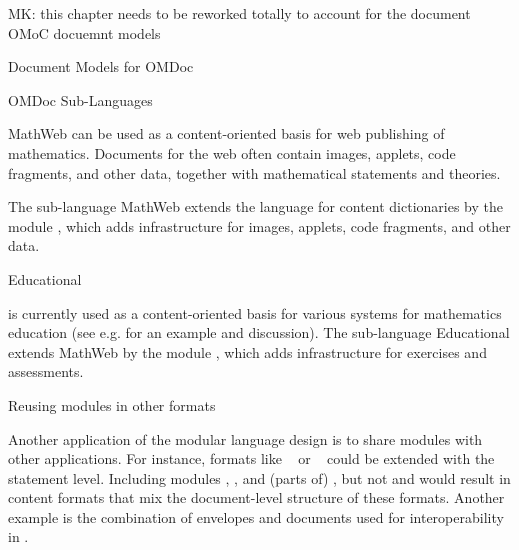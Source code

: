 \begin{oldpart}{MK: this chapter needs to be reworked totally to account for the document
    OMoC docuemnt models}
\begin{tchapter}[id=document-model]{Document Models for OMDoc}
\begin{tsection}[id=sub-languages]{OMDoc Sub-Languages}
\begin{tsubsection}[id=sub-languages:mathwebomdoc]{MathWeb {\omdoc}}
{\omdoc} can be used as a content-oriented basis for web publishing of
mathematics. Documents for the web often contain images, applets, code fragments,
and other data, together with mathematical statements and theories.

The {\omdoc} sub-language MathWeb {\omdoc} extends
the language for {\omdoc} content dictionaries by the module {},
which adds infrastructure for images, applets, code fragments, and other data.
\end{tsubsection}

\begin{tsubsection}[id=sub-languages:web]{Educational {\omdoc}}
  
  {\omdoc} is currently used as a content-oriented basis for various systems for
  mathematics education (see e.g. {} for an example and discussion).
  The {\omdoc} sub-language Educational {\omdoc}
  extends MathWeb {\omdoc} by the module {}, which adds
  infrastructure for exercises and assessments.
\end{tsubsection}

\begin{tsubsection}[id=spec-intro:reusing]{Reusing {\omdoc} modules in other formats}
  
  Another application of the modular language design is to share modules with other {\xml}
  applications. For instance, formats like
  {\docbook}~\cite{WalMue:dtdg2008} or {\xhtml}~\cite{W3C:xhtml2000} could be extended
  with the {\omdoc} statement level.  Including modules {},
  {}, and (parts of) {}, but not {} and
  {} would result in content formats that mix the document-level structure
  of these formats.  Another example is the combination of {\xmlrpc} envelopes and
  {\omdoc} documents used for interoperability in {}.
\end{tsubsection}
\end{tsection}
\end{tchapter}
\end{oldpart}


